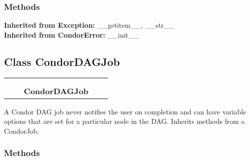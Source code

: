   \subsubsection{Methods}

  \noindent\textbf{Inherited from Exception:}
    \_\_getitem\_\_,
    \_\_str\_\_
    \\
  \noindent\textbf{Inherited from CondorError:}
    \_\_init\_\_


\subsection{Class CondorDAGJob}

    \label{pipeline:CondorDAGJob}
\begin{tabular}{cccccc}
\multicolumn{2}{r}{\settowidth{\BCL}{pipeline.CondorJob}\multirow{2}{\BCL}{pipeline.CondorJob}}
&&
  \\\cline{3-3}
  &&\multicolumn{1}{c|}{}
&&
  \\
&&\multicolumn{2}{l}{\textbf{CondorDAGJob}}
\end{tabular}

A Condor DAG job never notifies the user on completion and can have 
variable options that are set for a particular node in the DAG. Inherits 
methods from a CondorJob.



  \subsubsection{Methods}

    \label{pipeline:CondorDAGJob:__init__}
    \vspace{0.5ex}

